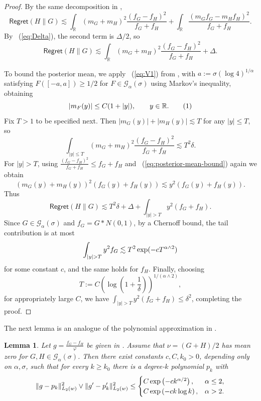 \documentclass[letterpaper,11pt]{article}
\newcommand\numberthis{\addtocounter{equation}{1}\tag{\theequation}}
\newcommand{\eqref}[1]{~(\ref{#1})}
\def\exp{\mathop{\rm exp}}
\newcommand{\reals}{\mathbb{R}}
\newcommand{\pth}[1]{\left( #1 \right)}
\newcommand{\calG}{{\mathcal{G}}}
\newtheorem{lemma}[theorem]{Lemma}
\theoremstyle{definition}
\newcommand{\Regret}{\mathsf{Regret}}
\begin{document}
    \begin{proof}
    By the
      same decomposition  in  ,
      \[
        \Regret(H\|G)
        \lesssim
        \int_\reals (m_G+m_H)^2 \frac{(f_G-f_H)^2}{f_G+f_H}
        +
        \int_\reals \frac{(m_Gf_G-m_Hf_H)^2}{f_G+f_H}.
      \]
      By \eqref{eq:Delta}, the second term is $\Delta/2$, so
      \[
        \Regret(H\|G)
        \lesssim
        \int_\reals (m_G+m_H)^2 \frac{(f_G-f_H)^2}{f_G+f_H}
        + \Delta.
      \]


      To bound the posterior mean, we apply \eqref{eq:V1} from ,
      with $a:=\sigma(\log 4)^{1/\alpha}$ satisfying $F([-a,a])\geq 1/2$ for  $F\in\calG_\alpha(\sigma)$ using Markov's inequality,
      obtaining
      \[
        |m_F(y)| \leq C(1+|y|),
        \qquad
        y\in\reals. \numberthis \label{eq:posterior-mean-bound}
      \]
Fix $T>1$ to be specified next. Then $
        |m_G(y)|+|m_H(y)|
        \lesssim
        T$ for any $|y|\leq T$,
      so
      \[
        \int_{|y|\leq T} (m_G+m_H)^2 \frac{(f_G-f_H)^2}{f_G+f_H}
        \lesssim
        T^2 \delta.
      \]
      For $|y| > T$, using
      $
        \frac{(f_G-f_H)^2}{f_G+f_H} \leq f_G+f_H$
      and \eqref{eq:posterior-mean-bound} again we obtain
      \[
        (m_G(y)+m_H(y))^2 (f_G(y)+f_H(y))
        \lesssim
        y^2(f_G(y)+f_H(y)).
      \]
      Thus
      \[
        \Regret(H\|G)
        \lesssim
        T^2 \delta + \Delta + \int_{|y|>T} y^2(f_G+f_H).
      \]
Since $G\in \calG_\alpha(\sigma)$ and $f_G = G * N(0,1)$, by a Chernoff bound, the tail contribution is at most
\[
\int_{|y|>T} y^2 f_G \lesssim T^2 \exp(-c T^{\alpha \wedge 2})
\]
for some constant $c$, and the same holds for $f_H$. Finally, choosing \[
        T:=C \pth{\log\pth{1+\frac{1}{\delta}}}^{1/(\alpha\wedge 2)},
      \]
      for appropriately large $C$,
      we have
     $ \int_{|y|>T} y^2(f_G+f_H) \leq \delta^2$, completing the proof.
\end{proof}











    The next lemma is an analogue of the polynomial approximation in .

    \begin{lemma}
      \label{lmm:exp-poly}
      Let $g = \frac{f_G-f_H}{\varphi}$
      be given in .
      Assume that $\nu=(G+H)/2$ has mean zero for $G, H \in \mathcal G_\alpha(\sigma)$. Then there exist constants
      $c,C, k_0>0$, depending only on $\alpha,\sigma$, such that for every $k\geq k_0$
      there is a degree-$k$ polynomial $p_k$ with
      \[
        \|g-p_k\|_{L_2(w)}^2
        \vee
        \|g'-p_k'\|_{L_2(w)}^2
        \leq
        \begin{cases}
          C \exp\pth{-c k^{\alpha/2}},
          & \alpha\leq 2,\\
          C \exp\pth{-c k \log k},
          & \alpha>2.
        \end{cases}
      \]
    \end{lemma}
\end{document}
